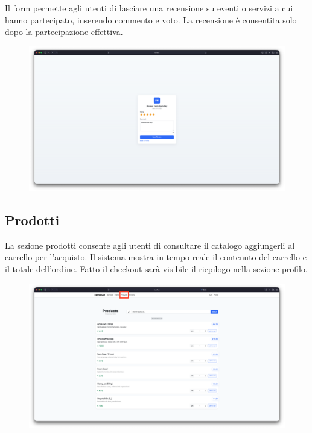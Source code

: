\documentclass[a4paper,12pt]{report}
\begin{document}
Il form permette agli utenti di lasciare una recensione su eventi o
servizi a cui hanno partecipato,
inserendo commento e voto. La recensione è consentita solo dopo la
partecipazione effettiva.

\begin{figure}[H]
  \centering
  \includegraphics[width=\textwidth, trim=0 0 0 0]{./img/users/give_review.png}
  \vspace{-1em}
  \label{fig:lascia recensione}
\end{figure}

\subsection*{Prodotti}
La sezione prodotti consente agli utenti di consultare il catalogo
aggiungerli al carrello per
l'acquisto. Il sistema mostra in tempo reale il contenuto del
carrello e il totale dell'ordine.
Fatto il checkout sarà visibile il riepilogo nella sezione profilo.

\begin{figure}[H]
  \centering
  \includegraphics[width=\textwidth, trim=0 0 0 0]{./img/users/products.png}
  \vspace{-1em}
  \label{fig:products}
\end{figure}
\end{document}
